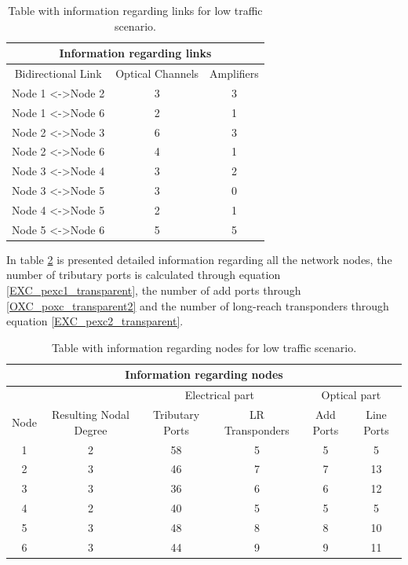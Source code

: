 \vspace{11pt}

\begin{table}[H]
\centering
\begin{tabular}{|c|c|c|}
\hline
\multicolumn{3}{|c|}{Information regarding links} \\ \hline
Bidirectional Link & Optical Channels & Amplifiers \\ \hline
Node 1 \textless{}-\textgreater Node 2 & 3 & 3 \\ \hline
Node 1 \textless{}-\textgreater Node 6 & 2 & 1 \\ \hline
Node 2 \textless{}-\textgreater Node 3 & 6 & 3 \\ \hline
Node 2 \textless{}-\textgreater Node 6 & 4 & 1 \\ \hline
Node 3 \textless{}-\textgreater Node 4 & 3 & 2 \\ \hline
Node 3 \textless{}-\textgreater Node 5 & 3 & 0 \\ \hline
Node 4 \textless{}-\textgreater Node 5 & 2 & 1 \\ \hline
Node 5 \textless{}-\textgreater Node 6 & 5 & 5 \\ \hline
\end{tabular}
\caption{Table with information regarding links for low traffic scenario.}
\label{lowLinks}
\end{table}

\vspace{11pt}

In table \ref{nodeLow} is presented detailed information regarding all the network nodes, the number of tributary ports is calculated through equation \ref{EXC_pexc1_transparent}, the number of add ports through \ref{OXC_poxc_transparent2} and the number of long-reach transponders through equation \ref{EXC_pexc2_transparent}.

\vspace{17pt}

\begin{table}[H]
\centering
\begin{tabular}{|c|c|c|c|c|c|}
\hline
\multicolumn{6}{|c|}{Information regarding nodes} \\ \hline
\multicolumn{2}{|c|}{} & \multicolumn{2}{c|}{Electrical part} & \multicolumn{2}{c|}{Optical part} \\ \hline
Node & Resulting Nodal Degree & Tributary Ports & LR Transponders & Add Ports & Line Ports \\ \hline
1 & 2 & 58 & 5 & 5 & 5 \\ \hline
2 & 3 & 46 & 7 & 7 & 13 \\ \hline
3 & 3 & 36 & 6 & 6 & 12 \\ \hline
4 & 2 & 40 & 5 & 5 & 5 \\ \hline
5 & 3 & 48 & 8 & 8 & 10 \\ \hline
6 & 3 & 44 & 9 & 9 & 11 \\ \hline
\end{tabular}
\caption{Table with information regarding nodes for low traffic scenario.}
\label{nodeLow}
\end{table}

